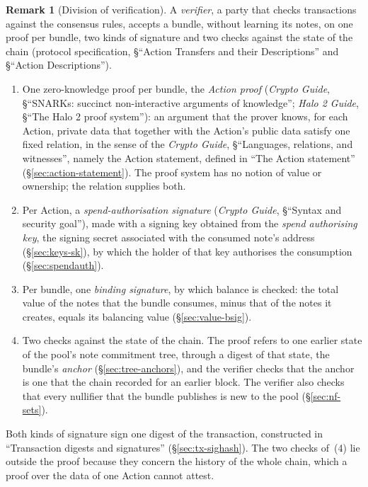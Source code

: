 \documentclass[11pt,a4paper]{article}
\theoremstyle{definition}
\newtheorem{remark}[theorem]{Remark}
\begin{document}
\begin{remark}[Division of verification]
A \emph{verifier}, a party that checks transactions against the consensus
rules, accepts a bundle, without learning its notes, on one proof per
bundle, two kinds of signature and two checks against the state of the
chain (protocol specification, \S``Action Transfers and their
Descriptions'' and \S``Action Descriptions'').
\begin{enumerate}[label=(\arabic*)]
\item One zero-knowledge proof per bundle, the \emph{Action proof}
  (\emph{Crypto Guide}, \S``SNARKs: succinct non-interactive arguments of
  knowledge''; \emph{Halo 2 Guide}, \S``The Halo 2 proof system''): an
  argument that the prover knows, for
  each Action, private data that together with the Action's public data
  satisfy one fixed relation, in the sense of the \emph{Crypto Guide},
  \S``Languages, relations, and witnesses'', namely the Action statement,
  defined in ``The Action statement'' (\S\ref{sec:action-statement}). The
  proof system has no notion of value or ownership; the relation supplies
  both.
\item Per Action, a \emph{spend-authorisation signature} (\emph{Crypto
  Guide}, \S``Syntax and security goal''), made with a signing key obtained
  from the \emph{spend authorising key}, the signing secret associated with
  the consumed note's address (\S\ref{sec:keys-sk}), by which the holder of
  that key authorises the consumption (\S\ref{sec:spendauth}).
\item Per bundle, one \emph{binding signature}, by which balance is checked:
  the total value of the notes that the bundle consumes, minus that of the
  notes it creates, equals its balancing value (\S\ref{sec:value-bsig}).
\item Two checks against the state of the chain. The proof refers to one
  earlier state of the pool's note commitment tree, through a digest of that
  state, the bundle's \emph{anchor} (\S\ref{sec:tree-anchors}), and the
  verifier checks that the anchor is one that the chain recorded for an
  earlier block. The verifier also checks that every nullifier that the
  bundle publishes is new to the pool (\S\ref{sec:nf-sets}).
\end{enumerate}
Both kinds of signature sign one digest of the transaction, constructed in
``Transaction digests and signatures'' (\S\ref{sec:tx-sighash}). The two
checks of~(4) lie outside the proof because they concern the history of the
whole chain, which a proof over the data of one Action cannot attest.
\end{remark}
\end{document}
